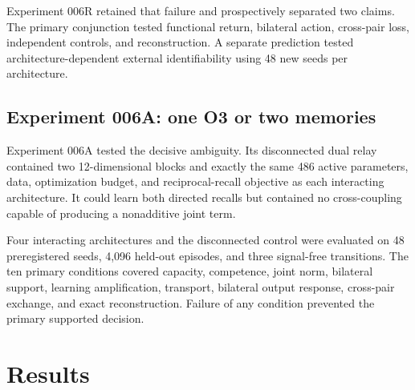 \documentclass[11pt,a4paper]{article}
\begin{document}
Experiment 006R retained that failure and prospectively separated two claims. The primary conjunction tested functional return, bilateral action, cross-pair loss, independent controls, and reconstruction. A separate prediction tested architecture-dependent external identifiability using 48 new seeds per architecture.

\subsection{Experiment 006A: one O3 or two memories}

Experiment 006A tested the decisive ambiguity. Its disconnected dual relay contained two 12-dimensional blocks and exactly the same 486 active parameters, data, optimization budget, and reciprocal-recall objective as each interacting architecture. It could learn both directed recalls but contained no cross-coupling capable of producing a nonadditive joint term.

Four interacting architectures and the disconnected control were evaluated on 48 preregistered seeds, 4,096 held-out episodes, and three signal-free transitions. The ten primary conditions covered capacity, competence, joint norm, bilateral support, learning amplification, transport, bilateral output response, cross-pair exchange, and exact reconstruction. Failure of any condition prevented the primary supported decision.

\section{Results}
\end{document}
